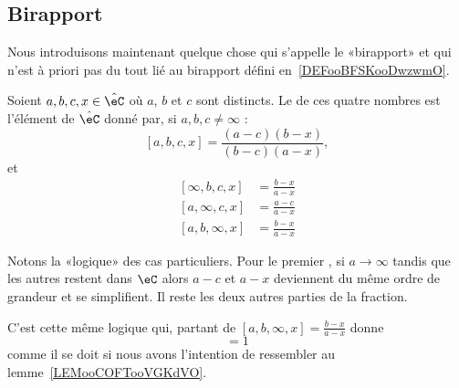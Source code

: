 \subsection{Birapport}

Nous introduisons maintenant quelque chose qui s'appelle le «birapport» et qui n'est à priori pas du tout lié au birapport défini en~\ref{DEFooBFSKooDwzwmO}.

\begin{definition}        \label{DEFooQYHVooMZwQMB}
	Soient \( a,b,c,x\in \hat\eC\) où \( a\), \( b\) et \( c\) sont distincts. Le  de ces quatre nombres est l'élément de \( \hat\eC\) donné par, si \( a,b,c\neq \infty\) :
	\begin{equation}        \label{EQooQJWZooOXKslh}
		[a,b,c,x]=\frac{ (a-c)(b-x) }{ (b-c)(a-x) },
	\end{equation}
	et
	\begin{subequations}
		\begin{align}
			[\infty,b,c,x] & =\frac{ b-x }{ a-x } \label{SUBEQooNSONooYUhuzB} \\
			[a,\infty,c,x] & =\frac{a-c}{a-x}                                 \\
			[a,b,\infty,x] & =\frac{ b-x }{ a-x }
		\end{align}
	\end{subequations}
\end{definition}

\begin{normaltext}
	Notons la «logique» des cas particuliers. Pour le premier%
	, si \( a\to\infty\) tandis que les autres restent dans \( \eC\) alors \( a-c\) et \( a-x\) deviennent du même ordre de grandeur et se simplifient. Il reste les deux autres parties de la fraction.

	C'est cette même logique qui, partant de \( [a,b,\infty,x]=\frac{ b-x }{ a-x }\) donne
	\begin{equation}
		[a,b,\infty,\infty]=1
	\end{equation}
	comme il se doit si nous avons l'intention de ressembler au lemme~\ref{LEMooCOFTooVGKdVO}.
\end{normaltext}

